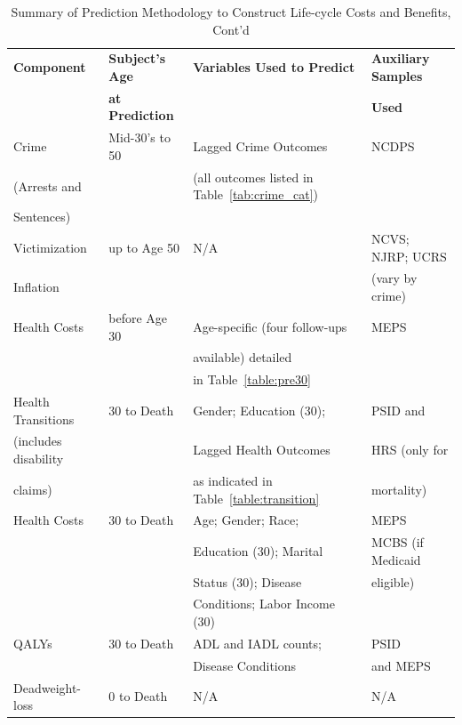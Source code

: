 \documentclass[static]{JJH-Beamer}
\begin{document}
\begin{frame}

\begin{table}[H]
\addtocounter{table}{-1}
\caption{Summary of Prediction Methodology to Construct Life-cycle Costs and Benefits, Cont'd}\label{table:sources}
\begin{center}
\begin{tabular}{llll}
\toprule
\textbf{Component} & \textbf{Subject's Age} & \textbf{Variables Used to Predict} & \textbf{Auxiliary Samples} \\
&   \textbf{at Prediction} &    & \textbf{Used}\\
\midrule
Crime        & Mid-30's to 50  & Lagged Crime Outcomes & NCDPS \\
(Arrests and &     & (all outcomes listed in Table~\ref{tab:crime_cat}) & \\
 Sentences)  &     & & \\
\midrule
Victimization  & up to Age 50  & N/A & NCVS; NJRP; UCRS \\
Inflation      &   &     & (vary by crime) \\
\midrule
Health Costs  & before Age 30 & Age-specific (four follow-ups  & MEPS \\
            &    & available) detailed & \\
            &    & in Table~\ref{table:pre30} & \\
\midrule
Health Transitions   & 30 to Death & Gender; Education (30);  & PSID and   \\
(includes disability   &    & Lagged Health Outcomes  & HRS (only for \\
claims)    &    & as indicated in Table~\ref{table:transition}  & mortality) \\
\midrule
Health Costs  & 30 to Death  & Age; Gender; Race;  & MEPS \\
              &  & Education (30); Marital  & MCBS (if Medicaid \\
              &  & Status (30); Disease & eligible) \\
              &  & Conditions; Labor Income (30) \\
\midrule
QALYs    & 30 to Death & ADL and IADL counts; & PSID  \\
         &   & Disease Conditions & and MEPS \\
\midrule
Deadweight-loss   & 0 to Death  & N/A & N/A  \\
\bottomrule
\end{tabular}
\end{center}
\end{table}

\end{frame}
\end{document}
